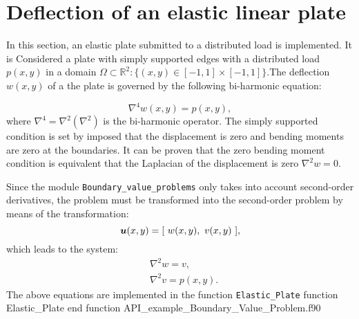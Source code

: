        
 \FloatBarrier      
 \newpage
 \section{Deflection of an elastic linear plate}\label{LinearPlate}  
 In this section,  an elastic plate submitted to a distributed load is implemented.    It is Considered a plate with simply supported edges 
 with a distributed load $p(x,y)$ in a domain $\Omega \subset \mathbb{R}^2 : $$\{ (x,y) \in [-1,1] \times [-1,1] \}$.The deflection $w(x,y)$ 
 of a the  plate is governed by the following bi-harmonic equation:
     
            \begin{equation*}
            	\nabla^4 w(x,y) = p(x,y),  %
            \end{equation*}      
where $\nabla ^4 = \nabla^2(\nabla^2) $ is the bi-harmonic operator. The simply supported condition is set by imposed that the displacement 
is zero and bending moments are zero at the boundaries. It can be proven that the zero bending moment condition is equivalent  that the 
Laplacian of the displacement is zero $\nabla^2 w= 0$. 
            
Since the module \verb|Boundary_value_problems|  only takes into account  second-order derivatives, the problem must be  transformed into the 
second-order problem by means of the transformation:
             \begin{equation*}
                \vect{u}(x,y) = [ \  w(x,y), \ v(x,y) \ ],
             \end{equation*}
which leads to the system: 
             \begin{align*}
                     &   \nabla^2 w  = v, \\
                     &   \nabla^2 v = p(x,y). 
            \end{align*}
The above equations are implemented in the function \verb|Elastic_Plate|
            \vspace{0.5cm} 
            {function Elastic_Plate}
            {end function}
            {API_example_Boundary_Value_Problem.f90}
            
